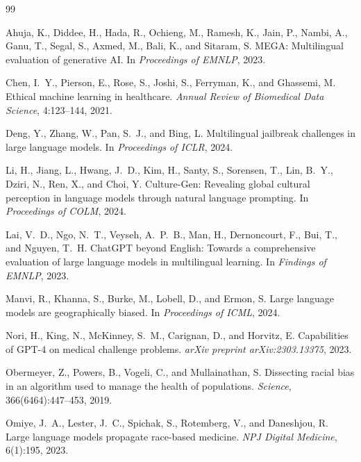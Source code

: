 \documentclass[11pt,a4paper]{article}
\begin{document}
\begin{thebibliography}{99}

Ahuja, K., Diddee, H., Hada, R., Ochieng, M., Ramesh, K., Jain, P., Nambi, A., Ganu, T., Segal, S., Axmed, M., Bali, K., and Sitaram, S.
\newblock MEGA: Multilingual evaluation of generative AI.
\newblock In \textit{Proceedings of EMNLP}, 2023.

Chen, I.~Y., Pierson, E., Rose, S., Joshi, S., Ferryman, K., and Ghassemi, M.
\newblock Ethical machine learning in healthcare.
\newblock \textit{Annual Review of Biomedical Data Science}, 4:123--144, 2021.

Deng, Y., Zhang, W., Pan, S.~J., and Bing, L.
\newblock Multilingual jailbreak challenges in large language models.
\newblock In \textit{Proceedings of ICLR}, 2024.

Li, H., Jiang, L., Hwang, J.~D., Kim, H., Santy, S., Sorensen, T., Lin, B.~Y., Dziri, N., Ren, X., and Choi, Y.
\newblock Culture-Gen: Revealing global cultural perception in language models through natural language prompting.
\newblock In \textit{Proceedings of COLM}, 2024.

Lai, V.~D., Ngo, N.~T., Veyseh, A.~P.~B., Man, H., Dernoncourt, F., Bui, T., and Nguyen, T.~H.
\newblock ChatGPT beyond English: Towards a comprehensive evaluation of large language models in multilingual learning.
\newblock In \textit{Findings of EMNLP}, 2023.

Manvi, R., Khanna, S., Burke, M., Lobell, D., and Ermon, S.
\newblock Large language models are geographically biased.
\newblock In \textit{Proceedings of ICML}, 2024.

Nori, H., King, N., McKinney, S.~M., Carignan, D., and Horvitz, E.
\newblock Capabilities of GPT-4 on medical challenge problems.
\newblock \textit{arXiv preprint arXiv:2303.13375}, 2023.

Obermeyer, Z., Powers, B., Vogeli, C., and Mullainathan, S.
\newblock Dissecting racial bias in an algorithm used to manage the health of populations.
\newblock \textit{Science}, 366(6464):447--453, 2019.

Omiye, J.~A., Lester, J.~C., Spichak, S., Rotemberg, V., and Daneshjou, R.
\newblock Large language models propagate race-based medicine.
\newblock \textit{NPJ Digital Medicine}, 6(1):195, 2023.


\end{thebibliography}
\end{document}
